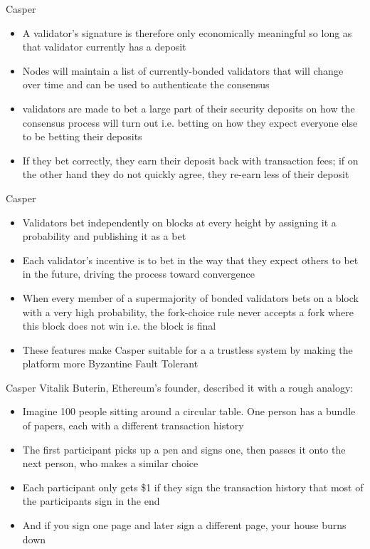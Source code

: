 \documentclass[9pt]{beamer}
\begin{document}
\begin{frame}{Casper}
	\begin{itemize}
		\item A validator's signature is therefore only economically meaningful so long as that validator currently has a deposit
		\item Nodes will maintain a list of currently-bonded validators that will change over time and can be used to authenticate the consensus
		\item validators are made to bet a large part of their security deposits on how the consensus process will turn out i.e. betting on how they expect everyone else to be betting their deposits
		\item If they bet correctly, they earn their deposit back with transaction fees; if on the other hand they do not quickly agree, they re-earn less of their deposit
	\end{itemize}
\end{frame}


\begin{frame}{Casper}
	\begin{itemize}
		\item Validators bet independently on blocks at every height by assigning it a probability and publishing it as a bet
		\item Each validator's incentive is to bet in the way that they expect others to bet in the future, driving the process toward convergence
		\item When every member of a supermajority of bonded validators bets on a block with a very high probability, the fork-choice rule never accepts a fork where this block does not win i.e. the block is final
		\item These features make Casper suitable for a a trustless system by making the platform more Byzantine Fault Tolerant
	\end{itemize}
\end{frame}



\begin{frame}{Casper}
	Vitalik Buterin, Ethereum's founder, described it with a rough analogy:
	\begin{itemize}
		\item Imagine 100 people sitting around a circular table. One person has a bundle of papers, each with a different transaction history
		\item The first participant picks up a pen and signs one, then passes it onto the next person, who makes a similar choice
		\item Each participant only gets \$1 if they sign the transaction history that most of the participants sign in the end
		\item And if you sign one page and later sign a different page, your house burns down
	\end{itemize}
\end{frame}
\end{document}
